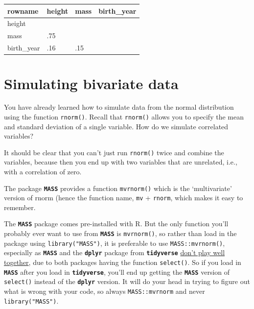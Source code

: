 \documentclass[]{book}
\begin{document}
\begin{tabular}{l|l|l|l}
\hline
rowname & height & mass & birth\_year\\
\hline
height &  &  & \\
\hline
mass & .75 &  & \\
\hline
birth\_year & .16 & .15 & \\
\hline
\end{tabular}

\hypertarget{simulating-bivariate-data}{%
\section{Simulating bivariate data}\label{simulating-bivariate-data}}

You have already learned how to simulate data from the normal distribution using the function \texttt{rnorm()}. Recall that \texttt{rnorm()} allows you to specify the mean and standard deviation of a single variable. How do we simulate correlated variables?

It should be clear that you can't just run \texttt{rnorm()} twice and combine the variables, because then you end up with two variables that are unrelated, i.e., with a correlation of zero.

The package \textbf{\texttt{MASS}} provides a function \texttt{mvrnorm()} which is the `multivariate' version of rnorm (hence the function name, \texttt{mv} + \texttt{rnorm}, which makes it easy to remember.

\begin{watchout}
The \textbf{\texttt{MASS}} package comes pre-installed with R. But the
only function you'll probably ever want to use from
\textbf{\texttt{MASS}} is \texttt{mvrnorm()}, so rather than load in the
package using \texttt{library("MASS")}, it is preferable to use
\texttt{MASS::mvrnorm()}, especially as \textbf{\texttt{MASS}} and the
\textbf{\texttt{dplyr}} package from \textbf{\texttt{tidyverse}}
\href{https://twitter.com/dalejbarr/status/516986671129452544?s=20}{don't
play well together}, due to both packages having the function
\texttt{select()}. So if you load in \textbf{\texttt{MASS}} after you
load in \textbf{\texttt{tidyverse}}, you'll end up getting the
\textbf{\texttt{MASS}} version of \texttt{select()} instead of the
\textbf{\texttt{dplyr}} version. It will do your head in trying to
figure out what is wrong with your code, so always
\texttt{MASS::mvrnorm} and never \texttt{library("MASS")}.
\end{watchout}
\end{document}
